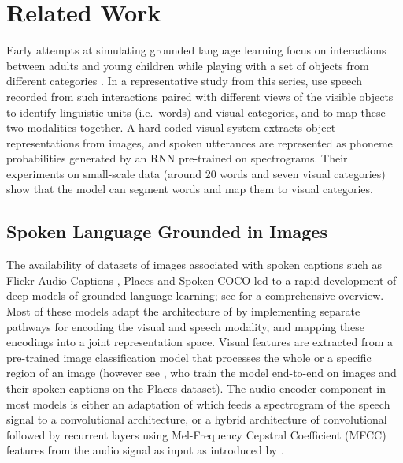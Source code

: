 \section{Related Work}
\label{sec:related}

Early attempts at simulating grounded language learning focus on
interactions between adults and young children while playing with a
set of objects from different categories \cite{roy1999learning,roy2002learning,
  gorniak2003visually,mukherjee2003visual}. In a representative study
from this series, \citet{roypentland2002learning} use speech recorded from
such interactions paired with different views of the visible objects
to identify linguistic units (i.e.\ words) and visual categories, and
to map these two modalities together. A hard-coded visual system
extracts object representations from images, and spoken utterances are
represented as phoneme probabilities generated by an RNN pre-trained on
spectrograms.  Their experiments on small-scale data (around 20 words
and seven visual categories) show that the model can segment words and
map them to visual categories.

\subsection{Spoken Language Grounded in Images}
\label{sec:images}
The availability of datasets of images associated with spoken captions
such as Flickr Audio Captions \cite{harwath2015deep}, Places
\cite{zhou2014learning} and Spoken COCO \cite{hsu2019transfer} led to
a rapid development of deep models of grounded language learning; see
\citet{chrupala-visually-2021} for a comprehensive overview. 
 Most of
these models adapt the architecture of \citet{karpathy2014deep} by
implementing separate pathways for encoding the visual and speech
modality, and mapping these encodings into a joint representation
space. Visual features are extracted from a pre-trained
image classification model that processes the whole or a specific
region of an image (however see \citet{harwath2018jointly}, who train the
model end-to-end on images and their spoken captions on the Places
dataset). The audio encoder component in most models is 
either an adaptation of \citet{harwath2016unsupervised} which feeds a
spectrogram of the speech signal to a convolutional architecture, or a
hybrid architecture of convolutional followed by recurrent layers using
Mel-Frequency Cepstral Coefficient (MFCC) features from the audio
signal as input as introduced by \citet{chrupala-etal-2017-representations}.

